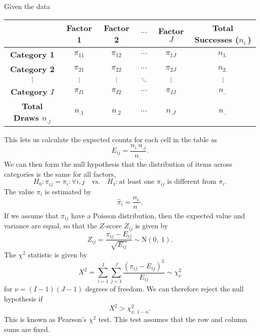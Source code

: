 \documentclass{article}
\begin{document}
Given the data
\begin{table}[H]
    \centering
    \begin{tabular}{c c c c c c}
        \toprule
                                        & \textbf{Factor 1} & \textbf{Factor 2} & \(\cdots\) & \textbf{Factor \(J\)} & \textbf{Total Successes (\(n_{i.}\))} \\
        \midrule
        \textbf{Category 1}             & \(\pi_{11}\)      & \(\pi_{12}\)      & \(\cdots\) & \(\pi_{1J}\)          & \(n_{1.}\)                            \\
        \textbf{Category 2}             & \(\pi_{21}\)      & \(\pi_{22}\)      & \(\cdots\) & \(\pi_{2J}\)          & \(n_{2.}\)                            \\
        \(\vdots\)                      & \(\vdots\)        & \(\vdots\)        & \(\ddots\) & \(\vdots\)            & \(\vdots\)                            \\
        \textbf{Category \(I\)}         & \(\pi_{I1}\)      & \(\pi_{I2}\)      & \(\cdots\) & \(\pi_{IJ}\)          & \(n_{..}\)                            \\
        \textbf{Total Draws \(n_{.j}\)} & \(n_{.1}\)        & \(n_{.2}\)        & \(\cdots\) & \(n_{.J}\)            & \(n_{..}\)                            \\
        \bottomrule
    \end{tabular}
\end{table}
This lets us calculate the expected counts for each cell in the table as
\begin{equation*}
    E_{ij} = \frac{n_{i.} n_{.j}}{n_{..}}.
\end{equation*}
We can then form the null hypothesis that the distribution of items across categories is the same for all factors,
\begin{equation*}
    H_0: \pi_{ij} = \pi_{i} : \forall i, j \quad \text{vs.} \quad H_1: \text{at least one \(\pi_{ij}\) is different from \(\pi_{i}\)}.
\end{equation*}
The value \(\pi_i\) is estimated by
\begin{equation*}
    \hat{\pi}_i = \frac{n_{i.}}{n_{..}}.
\end{equation*}
If we assume that \(\pi_{ij}\) have a Poisson distribution, then the expected value and variance are equal, so that
the \(Z\)-score \(Z_{ij}\) is given by
\begin{equation*}
    Z_{ij} = \frac{\pi_{ij} - E_{ij}}{\sqrt{E_{ij}}} \sim \mathrm{N}\left( 0,\: 1 \right).
\end{equation*}
The \(\chi^2\) statistic is given by
\begin{equation*}
    X^2 = \sum_{i = 1}^I \sum_{j = 1}^J \frac{\left( \pi_{ij} - E_{ij} \right)^2}{E_{ij}} \sim \chi_{\nu}^2
\end{equation*}
for \(\nu = \left( I - 1 \right)\left( J - 1 \right)\) degrees of freedom. We can therefore reject the null hypothesis if
\begin{equation*}
    X^2 > \chi_{\nu, \: 1 - \alpha}^2.
\end{equation*}
This is known as Pearson's \(\chi^2\) test. This test assumes that the row and column sums are fixed.
\end{document}
